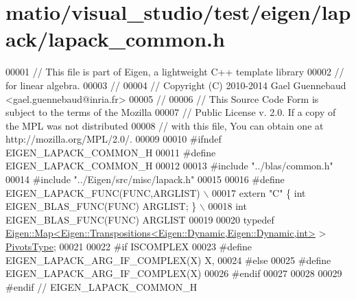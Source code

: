 \hypertarget{matio_2visual__studio_2test_2eigen_2lapack_2lapack__common_8h_source}{}\section{matio/visual\+\_\+studio/test/eigen/lapack/lapack\+\_\+common.h}
\label{matio_2visual__studio_2test_2eigen_2lapack_2lapack__common_8h_source}

\begin{DoxyCode}
00001 \textcolor{comment}{// This file is part of Eigen, a lightweight C++ template library}
00002 \textcolor{comment}{// for linear algebra.}
00003 \textcolor{comment}{//}
00004 \textcolor{comment}{// Copyright (C) 2010-2014 Gael Guennebaud <gael.guennebaud@inria.fr>}
00005 \textcolor{comment}{//}
00006 \textcolor{comment}{// This Source Code Form is subject to the terms of the Mozilla}
00007 \textcolor{comment}{// Public License v. 2.0. If a copy of the MPL was not distributed}
00008 \textcolor{comment}{// with this file, You can obtain one at http://mozilla.org/MPL/2.0/.}
00009 
00010 \textcolor{preprocessor}{#ifndef EIGEN\_LAPACK\_COMMON\_H}
00011 \textcolor{preprocessor}{#define EIGEN\_LAPACK\_COMMON\_H}
00012 
00013 \textcolor{preprocessor}{#include "../blas/common.h"}
00014 \textcolor{preprocessor}{#include "../Eigen/src/misc/lapack.h"}
00015 
00016 \textcolor{preprocessor}{#define EIGEN\_LAPACK\_FUNC(FUNC,ARGLIST)               \(\backslash\)}
00017 \textcolor{preprocessor}{  extern "C" \{ int EIGEN\_BLAS\_FUNC(FUNC) ARGLIST; \}   \(\backslash\)}
00018 \textcolor{preprocessor}{  int EIGEN\_BLAS\_FUNC(FUNC) ARGLIST}
00019 
00020 \textcolor{keyword}{typedef} \hyperlink{group___core___module_class_eigen_1_1_map}{Eigen::Map<Eigen::Transpositions<Eigen::Dynamic,Eigen::Dynamic,int>}
       > \hyperlink{group___core___module_class_eigen_1_1_map}{PivotsType};
00021 
00022 \textcolor{preprocessor}{#if ISCOMPLEX}
00023 \textcolor{preprocessor}{#define EIGEN\_LAPACK\_ARG\_IF\_COMPLEX(X) X,}
00024 \textcolor{preprocessor}{#else}
00025 \textcolor{preprocessor}{#define EIGEN\_LAPACK\_ARG\_IF\_COMPLEX(X)}
00026 \textcolor{preprocessor}{#endif}
00027 
00028 
00029 \textcolor{preprocessor}{#endif // EIGEN\_LAPACK\_COMMON\_H}
\end{DoxyCode}
